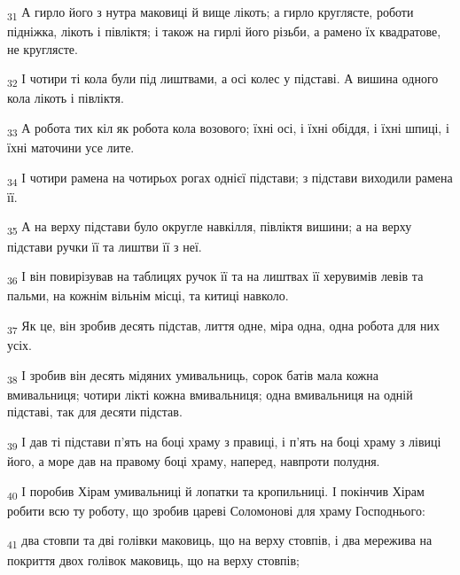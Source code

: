 \begin{tcolorbox}
\textsubscript{31} А гирло його з нутра маковиці й вище лікоть; а гирло круглясте, роботи підніжка, лікоть і півліктя; і також на гирлі його різьби, а рамено їх квадратове, не круглясте.
\end{tcolorbox}
\begin{tcolorbox}
\textsubscript{32} І чотири ті кола були під лиштвами, а осі колес у підставі. А вишина одного кола лікоть і півліктя.
\end{tcolorbox}
\begin{tcolorbox}
\textsubscript{33} А робота тих кіл як робота кола возового; їхні осі, і їхні обіддя, і їхні шпиці, і їхні маточини усе лите.
\end{tcolorbox}
\begin{tcolorbox}
\textsubscript{34} І чотири рамена на чотирьох рогах однієї підстави; з підстави виходили рамена її.
\end{tcolorbox}
\begin{tcolorbox}
\textsubscript{35} А на верху підстави було округле навкілля, півліктя вишини; а на верху підстави ручки її та лиштви її з неї.
\end{tcolorbox}
\begin{tcolorbox}
\textsubscript{36} І він повирізував на таблицях ручок її та на лиштвах її херувимів левів та пальми, на кожнім вільнім місці, та китиці навколо.
\end{tcolorbox}
\begin{tcolorbox}
\textsubscript{37} Як це, він зробив десять підстав, лиття одне, міра одна, одна робота для них усіх.
\end{tcolorbox}
\begin{tcolorbox}
\textsubscript{38} І зробив він десять мідяних умивальниць, сорок батів мала кожна вмивальниця; чотири лікті кожна вмивальниця; одна вмивальниця на одній підставі, так для десяти підстав.
\end{tcolorbox}
\begin{tcolorbox}
\textsubscript{39} І дав ті підстави п'ять на боці храму з правиці, і п'ять на боці храму з лівиці його, а море дав на правому боці храму, наперед, навпроти полудня.
\end{tcolorbox}
\begin{tcolorbox}
\textsubscript{40} І поробив Хірам умивальниці й лопатки та кропильниці. І покінчив Хірам робити всю ту роботу, що зробив цареві Соломонові для храму Господнього:
\end{tcolorbox}
\begin{tcolorbox}
\textsubscript{41} два стовпи та дві голівки маковиць, що на верху стовпів, і два мережива на покриття двох голівок маковиць, що на верху стовпів;
\end{tcolorbox}
